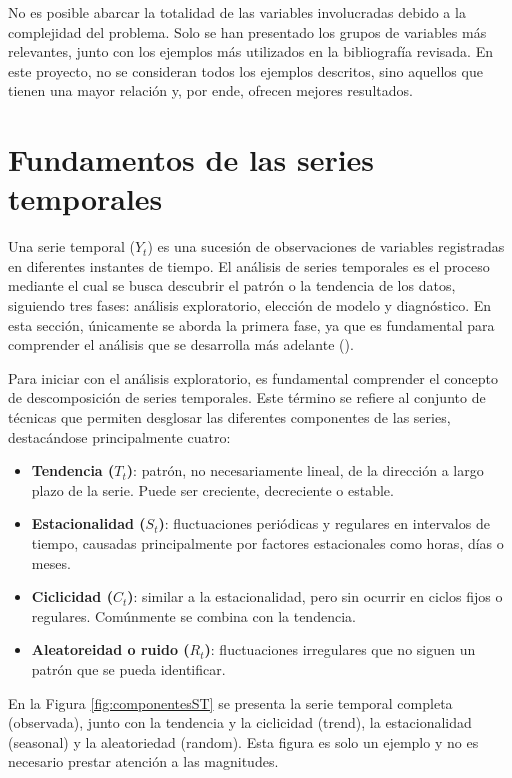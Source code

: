 \documentclass[12pt,a4paper]{report}
\begin{document}
No es posible abarcar la totalidad de las variables involucradas debido a la complejidad del problema. Solo se han presentado los grupos de variables más relevantes, junto con los ejemplos más utilizados en la bibliografía revisada. En este proyecto, no se consideran todos los ejemplos descritos, sino aquellos que tienen una mayor relación y, por ende, ofrecen mejores resultados.


\section{Fundamentos de las series temporales}

Una serie temporal ($Y_t$) es una sucesión de observaciones de variables registradas en diferentes instantes de tiempo. El análisis de series temporales es el proceso mediante el cual se busca descubrir el patrón o la tendencia de los datos, siguiendo tres fases: análisis exploratorio, elección de modelo y diagnóstico. En esta sección, únicamente se aborda la primera fase, ya que es fundamental para comprender el análisis que se desarrolla más adelante (\cite{rojasjimenez2022}).

Para iniciar con el análisis exploratorio, es fundamental comprender el concepto de descomposición de series temporales. Este término se refiere al conjunto de técnicas que permiten desglosar las diferentes componentes de las series, destacándose principalmente cuatro:

\begin{itemize}
    \item \textbf{Tendencia ($T_t$)}: patrón, no necesariamente lineal, de la dirección a largo plazo de la serie. Puede ser creciente, decreciente o estable.

    \item \textbf{Estacionalidad ($S_t$)}: fluctuaciones periódicas y regulares en intervalos de tiempo, causadas principalmente por factores estacionales como horas, días o meses.

    \item \textbf{Ciclicidad ($C_t$)}: similar a la estacionalidad, pero sin ocurrir en ciclos fijos o regulares. Comúnmente se combina con la tendencia.

    \item \textbf{Aleatoreidad o ruido ($R_t$)}: fluctuaciones irregulares que no siguen un patrón que se pueda identificar.
\end{itemize}

En la Figura \ref{fig:componentesST} se presenta la serie temporal completa (observada), junto con la tendencia y la ciclicidad (trend), la estacionalidad (seasonal) y la aleatoriedad (random). Esta figura es solo un ejemplo y no es necesario prestar atención a las magnitudes.
\end{document}
